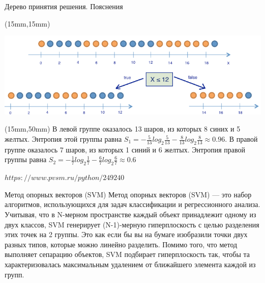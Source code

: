 \documentclass[10pt,pdf,hyperref={unicode}]{beamer}
\begin{document}
\begin{frame}{Дерево принятия решения. Пояснения}

\begin{textblock*}{120mm}(15mm,15mm)

\includegraphics[scale=0.35]{images/ris_03.png}

\end{textblock*} 

\begin{textblock*}{90mm}(15mm,50mm)
В левой группе оказалось 13 шаров, из которых 8 синих и 5 желтых. 
Энтропия этой группы равна
 $S_1=-\frac{5}{13}log_2{\frac{5}{13}}-\frac{8}{13}log_2{\frac{8}{13}} \approx 0.96$. 
В правой группе оказалось 7 шаров, из которых 1 синий и 6 желтых. 
Энтропия правой группы равна 
$S_2=-\frac{1}{7}log_2{\frac{1}{7}}-\frac{6}{7}log_2{\frac{6}{7}} \approx 0.6$

$https://www.pvsm.ru/python/249240$
\end{textblock*} 


\end{frame}

\begin{frame}{Метод опорных векторов (SVM) }
Метод опорных векторов (SVM) — это набор алгоритмов, использующихся для задач классификации и регрессионного анализа. 
Учитывая, что в N-мерном пространстве каждый объект принадлежит одному из двух классов, SVM генерирует (N-1)-мерную 
гиперплоскость с целью разделения этих точек на 2 группы. Это как если бы вы на бумаге изобразили точки двух разных 
типов, которые можно линейно разделить. Помимо того, что метод выполняет сепарацию объектов, SVM подбирает 
гиперплоскость так, чтобы та характеризовалась максимальным удалением от ближайшего элемента каждой из групп.
\end{frame}
\end{document}
